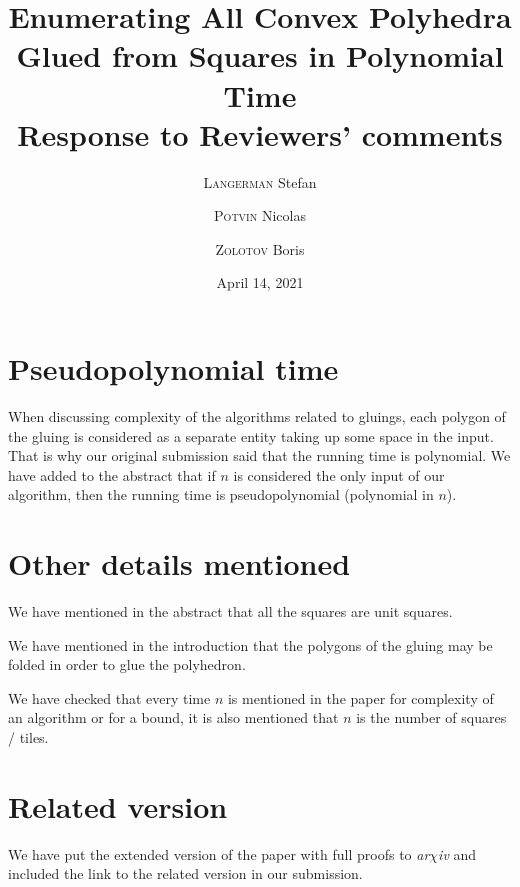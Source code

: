 \documentclass[a4paper,11pt]{article}
\title{Enumerating All Convex Polyhedra Glued from Squares in Polynomial Time \\
	Response to Reviewers' comments}
\author{{\scshape Langerman} Stefan\and {\scshape Potvin} Nicolas \and {\scshape Zolotov} Boris}
\date{April 14, 2021}
\begin{document}
 \maketitle

\section{Pseudopolynomial time}

When discussing complexity of the algorithms related to gluings, each polygon of the gluing is considered as a separate entity taking up some space in the input. That is why our original submission said that the running time is polynomial. We have added to the abstract that if $n$ is considered the only input of our algorithm, then the running time is pseudopolynomial (polynomial in $n$).

\section{Other details mentioned}

We have mentioned in the abstract that all the squares are unit squares.

We have mentioned in the introduction that the polygons of the gluing may be folded in order to glue the polyhedron.

We have checked that every time $n$ is mentioned in the paper for complexity of an algorithm or for a bound, it is also mentioned that $n$ is the number of squares / tiles.

\section{Related version}

We have put the extended version of the paper with full proofs to {\it ar$\chi$iv} and included the link to the related version in our submission.
\end{document}
